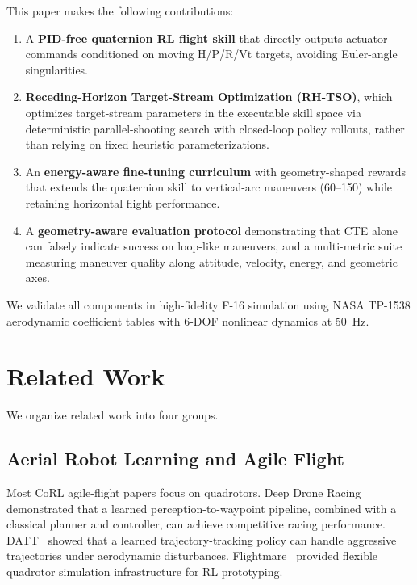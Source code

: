 \documentclass{article}
\begin{document}
This paper makes the following contributions:
\begin{enumerate}
  \item A \textbf{PID-free quaternion RL flight skill} that directly outputs actuator commands conditioned on moving H/P/R/Vt targets, avoiding Euler-angle singularities.
  \item \textbf{Receding-Horizon Target-Stream Optimization (RH-TSO)}, which optimizes target-stream parameters in the executable skill space via deterministic parallel-shooting search with closed-loop policy rollouts, rather than relying on fixed heuristic parameterizations.
  \item An \textbf{energy-aware fine-tuning curriculum} with geometry-shaped rewards that extends the quaternion skill to vertical-arc maneuvers (60\textdegree--150\textdegree) while retaining horizontal flight performance.
  \item A \textbf{geometry-aware evaluation protocol} demonstrating that CTE alone can falsely indicate success on loop-like maneuvers, and a multi-metric suite measuring maneuver quality along attitude, velocity, energy, and geometric axes.
\end{enumerate}

We validate all components in high-fidelity F-16 simulation using NASA TP-1538 aerodynamic coefficient tables with 6-DOF nonlinear dynamics at 50~Hz.


\section{Related Work}

We organize related work into four groups.

\subsection{Aerial Robot Learning and Agile Flight}

Most CoRL agile-flight papers focus on quadrotors.
Deep Drone Racing~\citep{kaufmann2023deep} demonstrated that a learned perception-to-waypoint pipeline, combined with a classical planner and controller, can achieve competitive racing performance.
DATT~\citep{huang2023datt} showed that a learned trajectory-tracking policy can handle aggressive trajectories under aerodynamic disturbances.
Flightmare~\citep{song2021flightmare} provided flexible quadrotor simulation infrastructure for RL prototyping.
\end{document}
